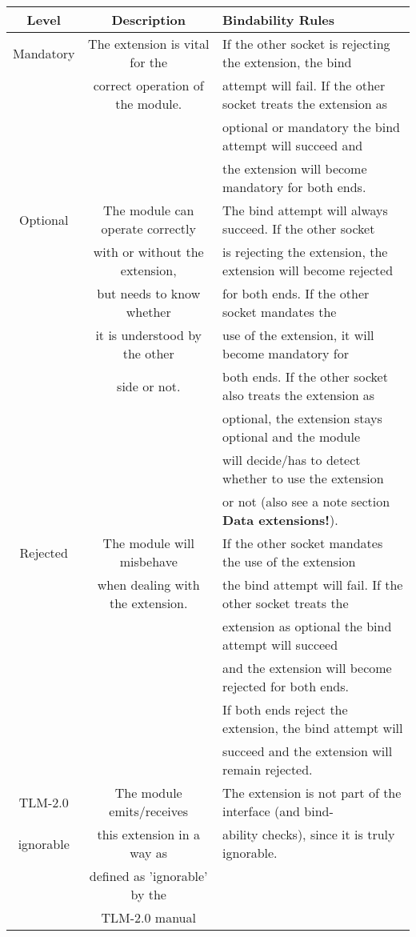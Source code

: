 \documentclass[a4paper,10pt]{article}          %
\begin{document}
\begin{table}[htdp]
\begin{center}
\begin{tabular}{|c|c|l|}
\hline
\textbf{Level} & \textbf{Description} & \textbf{Bindability Rules} \\
\hline
\hline
Mandatory & The extension is vital for the & If the other socket is rejecting the extension, the bind\\
& correct operation of the module. &  attempt will fail.  If the other socket treats the extension as\\ 
&&optional or mandatory the bind attempt will succeed and \\
&&the extension will become mandatory for both ends. \\
\hline
Optional & The module can operate correctly & The bind attempt will always succeed. If the other socket\\
& with or without the extension, &  is rejecting the extension, the extension will become rejected \\
& but needs to know whether&for both ends. If the other socket mandates the \\
& it is understood by the other &use of  the extension, it will become mandatory for\\
& side or not.& both ends. If the other socket also treats the extension as\\
&& optional, the extension stays optional and the module\\
&& will decide/has to detect whether to use the extension\\
&& or not (also see a note section \textbf{Data extensions!}).\\
\hline
Rejected & The module will misbehave & If the other socket mandates the use of the extension\\
& when dealing with the extension. &  the bind attempt will fail. If the other socket treats the \\
&&extension as optional the bind attempt will succeed\\
&& and the extension will become rejected for both ends.\\
&& If both ends reject the extension, the bind attempt will\\
&& succeed and the extension will remain rejected.\\
\hline
TLM-2.0 & The module emits/receives &The extension is not part of the interface (and bind-\\
ignorable& this extension in a way as &  ability checks), since it is truly ignorable. \\
& defined as 'ignorable' by the&\\
& TLM-2.0 manual&\\
\hline
\end{tabular}
\end{center}
\label{default}
\end{table}%
\end{document}
